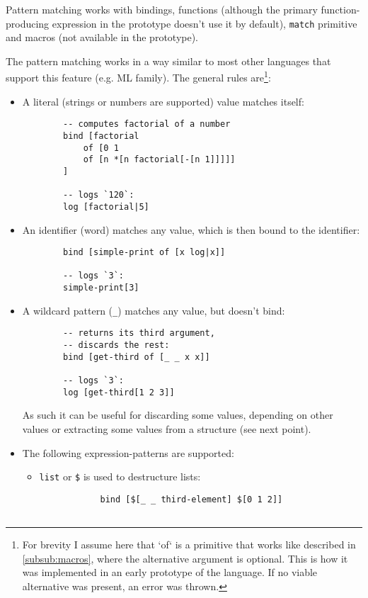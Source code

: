 Pattern matching works with bindings, functions (although the primary function-producing expression in the prototype doesn't use it by default), \texttt{match} primitive and macros (not available in the prototype).

The pattern matching works in a way similar to most other languages that support this feature (e.g. ML family). The general rules are\footnote{For brevity I assume here that `of` is a primitive that works like described in \ref{subsub:macros}, where the alternative argument is optional. This is how it was implemented in an early prototype of the language. If no viable alternative was present, an error was thrown.}:
\begin{itemize}
    \item A literal (strings or numbers are supported) value matches itself:
    \begin{lstlisting}
        -- computes factorial of a number
        bind [factorial
            of [0 1 
            of [n *[n factorial[-[n 1]]]]]
        ]
        
        -- logs `120`:
        log [factorial|5]
    \end{lstlisting}
    \item An identifier (word) matches any value, which is then bound to the identifier:
    \begin{lstlisting}
        bind [simple-print of [x log|x]]
        
        -- logs `3`:
        simple-print[3]
    \end{lstlisting}
    \item A wildcard pattern (\texttt{\_}) matches any value, but doesn't bind:
    \begin{lstlisting}
        -- returns its third argument,
        -- discards the rest:
        bind [get-third of [_ _ x x]]
        
        -- logs `3`:
        log [get-third[1 2 3]]
    \end{lstlisting}
    As such it can be useful for discarding some values, depending on other values or extracting some values from a structure (see next point).
    \item The following expression-patterns are supported:
    \begin{itemize}
        \item \texttt{list} or \texttt{\$} is used to destructure lists:
        \begin{lstlisting}
            bind [$[_ _ third-element] $[0 1 2]]
            

\end{lstlisting}
\end{itemize}
\end{itemize}
